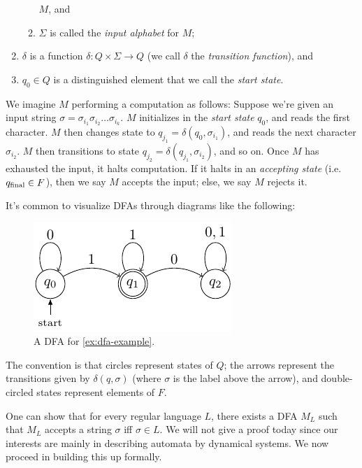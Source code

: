 \documentclass{fkpaper}
\begin{document}
\begin{multicols}{2}
\begin{definition}
\begin{enumerate}
\begin{enumerate}[label=\roman*)]
            $M$, and
          \item $\Sigma$ is called the \emph{input alphabet} for $M$;
        \end{enumerate}
      \item $\delta$ is a function $\delta : Q \times \Sigma \to Q$ (we
        call $\delta$ the \emph{transition function}), and
      \item $q_0 \in Q$ is a distinguished element that we call the
        \emph{start state}. \qedhere
    \end{enumerate}
  \end{definition}
  We imagine $M$ performing a computation as follows: Suppose we're
  given an input string $\sigma = \sigma_{i_1} \sigma_{i_2} \ldots
  \sigma_{i_k}$. $M$ initializes in the \emph{start state} $q_0$, and
  reads the first character. $M$ then changes state to $q_{j_1} =
  \delta(q_0, \sigma_{i_1})$, and reads the next character
  $\sigma_{i_2}$. $M$ then transitions to state $q_{j_2} =
  \delta(q_{j_1}, \sigma_{i_2})$, and so on. Once $M$ has exhausted the
  input, it halts computation. If it halts in an \emph{accepting state}
  (i.e.\ $q_{\rm final} \in F$), then we say $M$ accepts the input;
  else, we say $M$ rejects it.

  It's common to visualize DFAs through diagrams like the following:
  \begin{figure}[H]
    \centering
    \includegraphics[scale=1.2]{figures/dfa-example.pdf}
    \caption{A DFA for \cref{ex:dfa-example}.}
  \end{figure}
  The convention is that circles represent states of $Q$; the arrows
  represent the transitions given by $\delta(q, \sigma)$ (where $\sigma$
  is the label above the arrow), and double-circled states represent
  elements of $F$.

  One can show that for every regular language $L$, there exists a DFA
  $M_L$ such that $M_L$ accepts a string $\sigma$ iff $\sigma \in L$. We
  will not give a proof today since our interests are mainly in
  describing automata by dynamical systems. We now proceed in building
  this up formally.


\end{multicols}
\end{document}
